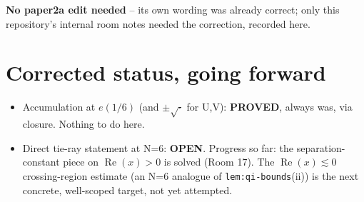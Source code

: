 \documentclass[11pt]{article}
\begin{document}
\textbf{No paper2a edit needed} -- its own wording was already correct; only this repository's
internal room notes needed the correction, recorded here.

\section*{Corrected status, going forward}

\begin{itemize}
\item Accumulation at $e(1/6)$ (and $\pm\sqrt{\cdot}$ for U,V): \textbf{PROVED}, always was, via
closure. Nothing to do here.
\item Direct tie-ray statement at N=6: \textbf{OPEN}. Progress so far: the separation-constant
piece on $\operatorname{Re}(x)>0$ is solved (Room 17). The $\operatorname{Re}(x)\lesssim0$
crossing-region estimate (an N=6 analogue of \texttt{lem:qi-bounds}(ii)) is the next concrete,
well-scoped target, not yet attempted.
\end{itemize}
\end{document}
